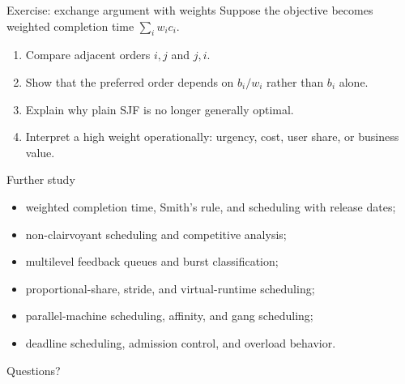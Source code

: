 \documentclass[aspectratio=169,11pt]{beamer}
\begin{document}
\begin{frame}{Exercise: exchange argument with weights}
  Suppose the objective becomes weighted completion time $\sum_i w_i c_i$.
  \begin{enumerate}
    \item Compare adjacent orders $i,j$ and $j,i$.
    \item Show that the preferred order depends on $b_i/w_i$ rather than $b_i$ alone.
    \item Explain why plain SJF is no longer generally optimal.
    \item Interpret a high weight operationally: urgency, cost, user share, or business value.
  \end{enumerate}
\end{frame}

\begin{frame}{Further study}
  \begin{itemize}
    \item weighted completion time, Smith's rule, and scheduling with release dates;
    \item non-clairvoyant scheduling and competitive analysis;
    \item multilevel feedback queues and burst classification;
    \item proportional-share, stride, and virtual-runtime scheduling;
    \item parallel-machine scheduling, affinity, and gang scheduling;
    \item deadline scheduling, admission control, and overload behavior.
  \end{itemize}
  \begin{center}
    \Large Questions?
  \end{center}
\end{frame}
\end{document}
